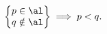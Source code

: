 \begin{lem}
    \label{1.19:lem1}
    \[ \left\{ 
    \begin{matrix}
        p \in \al\\
        q \notin \al 
    \end{matrix}
    \right\}\implies p < q.\]
\end{lem}
